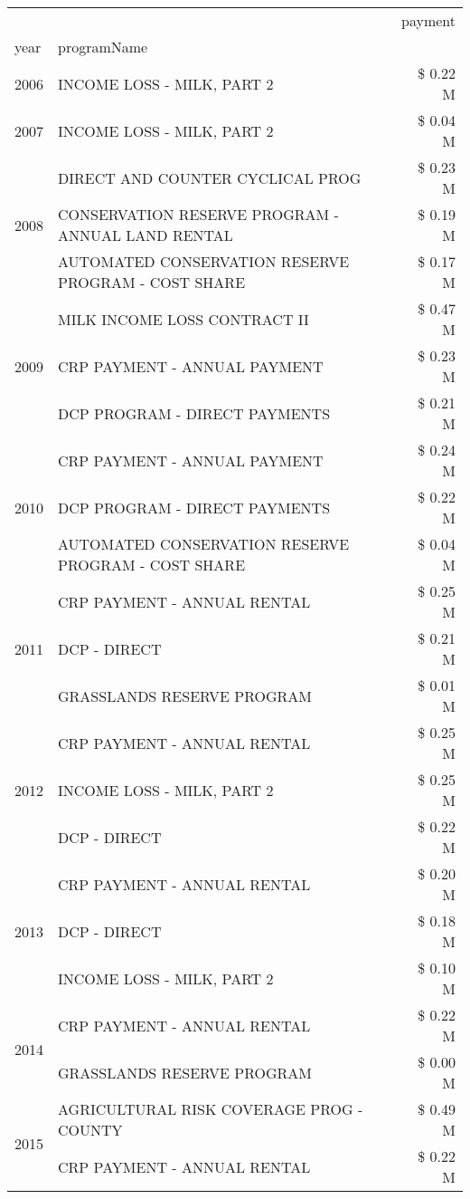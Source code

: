 \begin{tabular}{llr}
\toprule
 &  & payment \\
year & programName &  \\
\midrule
2006 & INCOME LOSS - MILK, PART 2 & \$ 0.22 M \\
\cline{1-3}
2007 & INCOME LOSS - MILK, PART 2 & \$ 0.04 M \\
\cline{1-3}
\multirow[t]{3}{*}{2008} & DIRECT AND COUNTER CYCLICAL PROG & \$ 0.23 M \\
 & CONSERVATION RESERVE PROGRAM - ANNUAL LAND RENTAL & \$ 0.19 M \\
 & AUTOMATED CONSERVATION RESERVE PROGRAM - COST SHARE & \$ 0.17 M \\
\cline{1-3}
\multirow[t]{3}{*}{2009} & MILK INCOME LOSS CONTRACT II & \$ 0.47 M \\
 & CRP PAYMENT - ANNUAL PAYMENT & \$ 0.23 M \\
 & DCP PROGRAM - DIRECT PAYMENTS & \$ 0.21 M \\
\cline{1-3}
\multirow[t]{3}{*}{2010} & CRP PAYMENT - ANNUAL PAYMENT & \$ 0.24 M \\
 & DCP PROGRAM - DIRECT PAYMENTS & \$ 0.22 M \\
 & AUTOMATED CONSERVATION RESERVE PROGRAM - COST SHARE & \$ 0.04 M \\
\cline{1-3}
\multirow[t]{3}{*}{2011} & CRP PAYMENT - ANNUAL RENTAL & \$ 0.25 M \\
 & DCP - DIRECT & \$ 0.21 M \\
 & GRASSLANDS RESERVE PROGRAM & \$ 0.01 M \\
\cline{1-3}
\multirow[t]{3}{*}{2012} & CRP PAYMENT - ANNUAL RENTAL & \$ 0.25 M \\
 & INCOME LOSS - MILK, PART 2 & \$ 0.25 M \\
 & DCP - DIRECT & \$ 0.22 M \\
\cline{1-3}
\multirow[t]{3}{*}{2013} & CRP PAYMENT - ANNUAL RENTAL & \$ 0.20 M \\
 & DCP - DIRECT & \$ 0.18 M \\
 & INCOME LOSS - MILK, PART 2 & \$ 0.10 M \\
\cline{1-3}
\multirow[t]{2}{*}{2014} & CRP PAYMENT - ANNUAL RENTAL & \$ 0.22 M \\
 & GRASSLANDS RESERVE PROGRAM & \$ 0.00 M \\
\cline{1-3}
\multirow[t]{3}{*}{2015} & AGRICULTURAL RISK COVERAGE PROG - COUNTY & \$ 0.49 M \\
 & CRP PAYMENT - ANNUAL RENTAL & \$ 0.22 M \\

\end{tabular}
